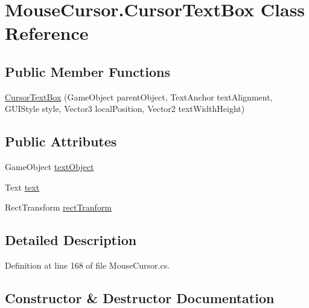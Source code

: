 \hypertarget{class_mouse_cursor_1_1_cursor_text_box}{}\section{Mouse\+Cursor.\+Cursor\+Text\+Box Class Reference}
\label{class_mouse_cursor_1_1_cursor_text_box}
\subsection*{Public Member Functions}
\begin{DoxyCompactItemize}
\item 
\hyperlink{class_mouse_cursor_1_1_cursor_text_box_a10d493dc1f872c363281412dee392ba4}{Cursor\+Text\+Box} (Game\+Object parent\+Object, Text\+Anchor text\+Alignment, G\+U\+I\+Style style, Vector3 local\+Position, Vector2 text\+Width\+Height)
\end{DoxyCompactItemize}
\subsection*{Public Attributes}
\begin{DoxyCompactItemize}
\item 
Game\+Object \hyperlink{class_mouse_cursor_1_1_cursor_text_box_a283319b6e5e40cebf12f5a901c58466e}{text\+Object}
\item 
Text \hyperlink{class_mouse_cursor_1_1_cursor_text_box_aa5f80888f3b5655e9ac3b09fdb631d84}{text}
\item 
Rect\+Transform \hyperlink{class_mouse_cursor_1_1_cursor_text_box_a372999a43870de2f0a09f66390893857}{rect\+Tranform}
\end{DoxyCompactItemize}


\subsection{Detailed Description}


Definition at line 168 of file Mouse\+Cursor.\+cs.



\subsection{Constructor \& Destructor Documentation}
\mbox{\label{class_mouse_cursor_1_1_cursor_text_box_a10d493dc1f872c363281412dee392ba4}} 
